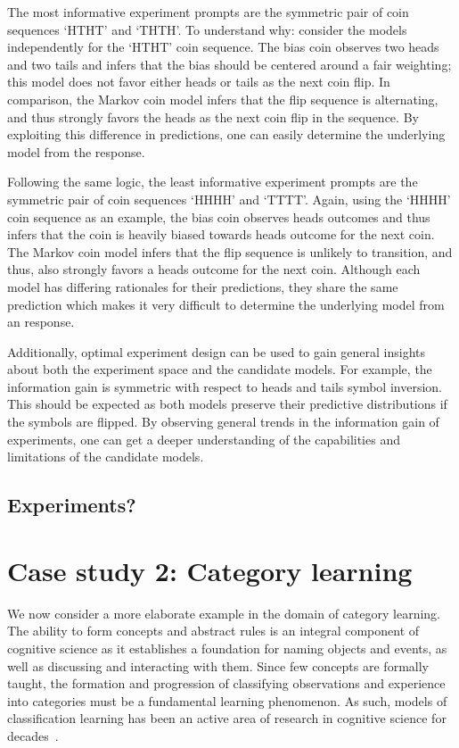 \documentclass{article}
\begin{document}
The most informative experiment prompts are the symmetric pair of coin sequences `HTHT' and `THTH'. To understand why: consider the models independently for the `HTHT' coin sequence. The bias coin observes two heads and two tails and infers that the bias should be centered around a fair weighting; this model does not favor either heads or tails as the next coin flip. In comparison, the Markov coin model infers that the flip sequence is alternating, and thus strongly favors the heads as the next coin flip in the sequence. By exploiting this difference in predictions, one can easily determine the underlying model from the response.

Following the same logic, the least informative experiment prompts are the symmetric pair of coin sequences `HHHH' and `TTTT'. Again, using the `HHHH' coin sequence as an example, the bias coin observes heads outcomes and thus infers that the coin is heavily biased towards heads outcome for the next coin. The Markov coin model infers that the flip sequence is unlikely to transition, and thus, also strongly favors a heads outcome for the next coin. Although each model has differing rationales for their predictions, they share the same prediction which makes it very difficult to determine the underlying model from an response.

Additionally, optimal experiment design can be used to gain general insights about both the experiment space and the candidate models. For example, the information gain is symmetric with respect to heads and tails symbol inversion. This should be expected as both models preserve their predictive distributions if the symbols are flipped. By observing general trends in the information gain of experiments, one can get a deeper understanding of the capabilities and limitations of the candidate models.

\subsection{Experiments?}


\section{Case study 2: Category learning}

We now consider a more elaborate example in the domain of category learning. The ability to form concepts and abstract rules is an integral component of cognitive science as it establishes a foundation for naming objects and events, as well as discussing and interacting with them. Since few concepts are formally taught, the formation and progression of classifying observations and experience into categories must be a fundamental learning phenomenon. As such, models of classification learning has been an active area of research in cognitive science for decades~\cite{machery10:bbs}. 
\end{document}
